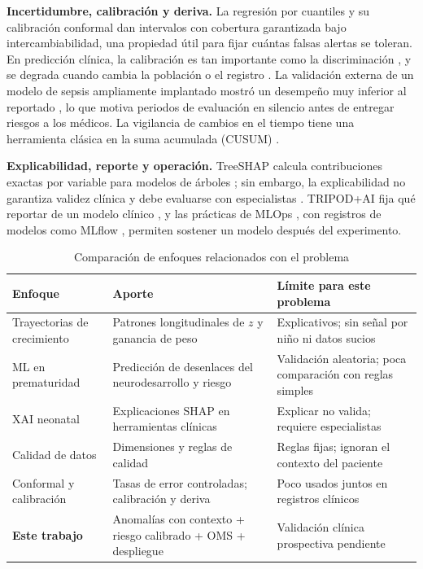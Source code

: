 \textbf{Incertidumbre, calibración y deriva.} La regresión por cuantiles \cite{koenker1978} y su calibración conformal \cite{romano2019,angelopoulos2023} dan intervalos con cobertura garantizada bajo intercambiabilidad, una propiedad útil para fijar cuántas falsas alertas se toleran. En predicción clínica, la calibración es tan importante como la discriminación \cite{vancalster2019}, y se degrada cuando cambia la población o el registro \cite{davis2017}. La validación externa de un modelo de sepsis ampliamente implantado mostró un desempeño muy inferior al reportado \cite{wong2021}, lo que motiva periodos de evaluación en silencio antes de entregar riesgos a los médicos. La vigilancia de cambios en el tiempo tiene una herramienta clásica en la suma acumulada (CUSUM) \cite{page1954}.

\textbf{Explicabilidad, reporte y operación.} TreeSHAP calcula contribuciones exactas por variable para modelos de árboles \cite{lundberg2020}; sin embargo, la explicabilidad no garantiza validez clínica y debe evaluarse con especialistas \cite{salih2024,ghassemi2021}. TRIPOD+AI fija qué reportar de un modelo clínico \cite{collins2024}, y las prácticas de MLOps \cite{kreuzberger2023}, con registros de modelos como MLflow \cite{zaharia2018}, permiten sostener un modelo después del experimento.

\begin{table}[t]
\centering
\caption{Comparación de enfoques relacionados con el problema}
\label{tab:estado}
\footnotesize
\setlength{\tabcolsep}{3pt}
\begin{tabularx}{\columnwidth}{@{}>{\raggedright\arraybackslash}p{1.55cm}>{\raggedright\arraybackslash}X>{\raggedright\arraybackslash}X@{}}
\toprule
\textbf{Enfoque} & \textbf{Aporte} & \textbf{Límite para este problema} \\
\midrule
Trayectorias de crecimiento \cite{ren2024,nel2026,melo2016} & Patrones longitudinales de $z$ y ganancia de peso & Explicativos; sin señal por niño ni datos sucios \\
ML en prematuridad \cite{baker2023,demirci2024,mlrisk2024} & Predicción de desenlaces del neurodesarrollo y riesgo & Validación aleatoria; poca comparación con reglas simples \\
XAI neonatal \cite{wang2024,salih2024} & Explicaciones SHAP en herramientas clínicas & Explicar no valida; requiere especialistas \\
Calidad de datos \cite{kahn2016,weiskopf2013} & Dimensiones y reglas de calidad & Reglas fijas; ignoran el contexto del paciente \\
Conformal y calibración \cite{romano2019,vancalster2019,davis2017} & Tasas de error controladas; calibración y deriva & Poco usados juntos en registros clínicos \\
\midrule
\textbf{Este trabajo} & Anomalías con contexto + riesgo calibrado + OMS + despliegue & Validación clínica prospectiva pendiente \\
\bottomrule
\end{tabularx}
\end{table}

